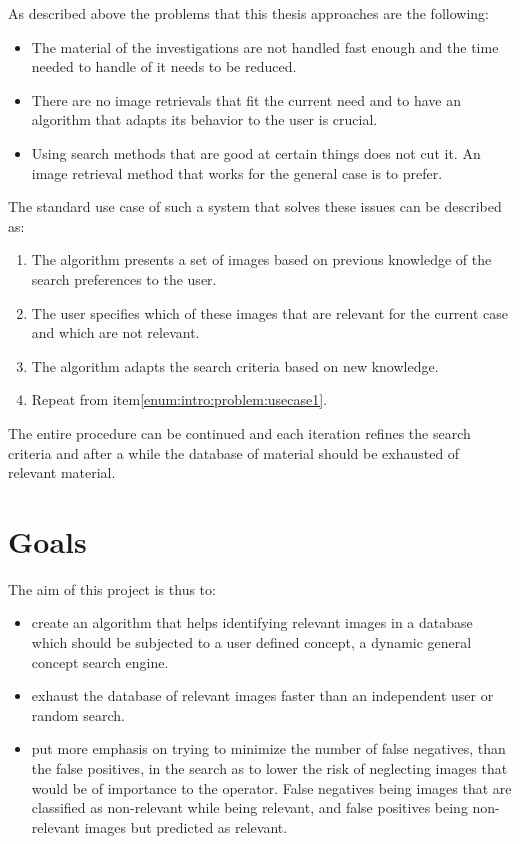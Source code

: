 As described above the problems that this thesis approaches are the following:
\begin{itemize}
	\item The material of the investigations are not handled fast enough and the time needed to handle of it needs to be reduced.
	\item There are no image retrievals that fit the current need and to have an algorithm that adapts its behavior to the user is crucial.
	\item Using search methods that are good at certain things does not cut it. An image retrieval method that works for the general case is to prefer.
\end{itemize}

The standard use case of such a system that solves these issues can be described as:
\begin{enumerate}
	\item \label{enum:intro:problem:usecase1} The algorithm presents a set of images based on previous knowledge of the search preferences to the user. 
	\item The user specifies which of these images that are relevant for the current case and which are not relevant. 
	\item The algorithm adapts the search criteria based on new knowledge.
	\item Repeat from item\ref{enum:intro:problem:usecase1}.
\end{enumerate}

The entire procedure can be continued and each iteration refines the search criteria and after a while the database of material should be exhausted of relevant material.
\section{Goals}
\label{sec:intro:goals}
The aim of this project is thus to:
\begin{itemize} 
	\item create an algorithm that helps identifying relevant images in a database which should be subjected to a user defined concept, a dynamic general concept search engine. 
	\item exhaust the database of relevant images faster than an independent user or random search. 
	\item put more emphasis on trying to minimize the number of false negatives, than the false positives, in the search as to lower the risk of neglecting images that would be of importance to the operator. False negatives being images that are classified as non-relevant while being relevant, and false positives being non-relevant images but predicted as relevant. 
\end{itemize}

